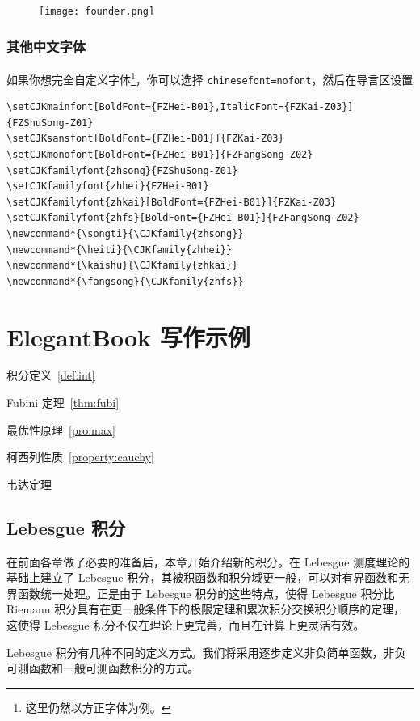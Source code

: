 \documentclass[lang=cn,newtx,10pt,scheme=chinese]{elegantbook}
\begin{document}
\begin{figure}[!htb]
\centering
\texttt{[image: founder.png]}
\end{figure}

\subsection{其他中文字体}
如果你想完全自定义字体\footnote{这里仍然以方正字体为例。}，你可以选择 \lstinline{chinesefont=nofont}，然后在导言区设置
\begin{lstlisting}
\setCJKmainfont[BoldFont={FZHei-B01},ItalicFont={FZKai-Z03}]{FZShuSong-Z01}
\setCJKsansfont[BoldFont={FZHei-B01}]{FZKai-Z03}
\setCJKmonofont[BoldFont={FZHei-B01}]{FZFangSong-Z02}
\setCJKfamilyfont{zhsong}{FZShuSong-Z01}
\setCJKfamilyfont{zhhei}{FZHei-B01}
\setCJKfamilyfont{zhkai}[BoldFont={FZHei-B01}]{FZKai-Z03}
\setCJKfamilyfont{zhfs}[BoldFont={FZHei-B01}]{FZFangSong-Z02}
\newcommand*{\songti}{\CJKfamily{zhsong}}
\newcommand*{\heiti}{\CJKfamily{zhhei}}
\newcommand*{\kaishu}{\CJKfamily{zhkai}}
\newcommand*{\fangsong}{\CJKfamily{zhfs}}
\end{lstlisting}

\chapter{ElegantBook 写作示例}

\begin{introduction}
  \item 积分定义~\ref{def:int}
  \item Fubini 定理~\ref{thm:fubi}
  \item 最优性原理~\ref{pro:max}
  \item 柯西列性质~\ref{property:cauchy}
  \item 韦达定理
\end{introduction}

\section{Lebesgue 积分}
在前面各章做了必要的准备后，本章开始介绍新的积分。在 Lebesgue 测度理论的基础上建立了 Lebesgue 积分，其被积函数和积分域更一般，可以对有界函数和无界函数统一处理。正是由于 Lebesgue 积分的这些特点，使得 Lebesgue 积分比 Riemann 积分具有在更一般条件下的极限定理和累次积分交换积分顺序的定理，这使得 Lebesgue 积分不仅在理论上更完善，而且在计算上更灵活有效。

Lebesgue 积分有几种不同的定义方式。我们将采用逐步定义非负简单函数，非负可测函数和一般可测函数积分的方式。
\end{document}
